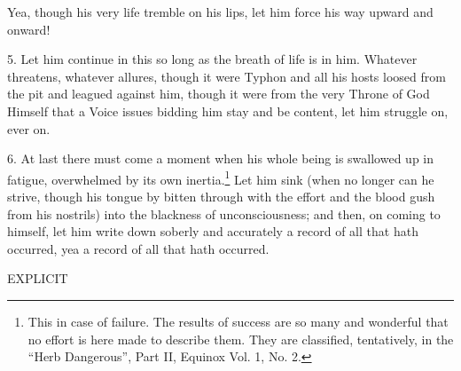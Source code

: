 Yea, though his very life tremble on his lips, let him force his way upward and onward!

5. Let him continue in this so long as the breath of life is in him. Whatever threatens, whatever allures, though it were Typhon and all his hosts loosed from the pit and leagued against him, though it were from the very Throne of God Himself that a Voice issues bidding him stay and be content, let him struggle on, ever on.

6. At last there must come a moment when his whole being is swallowed up in fatigue, overwhelmed by its own inertia.\footnote{This in case of failure. The results of success are so many and wonderful that no effort is here made to describe them. They are classified, tentatively, in the \enquote{Herb Dangerous}, Part II, Equinox Vol. 1, No. 2.} Let him sink (when no longer can he strive, though his tongue by bitten through with the effort and the blood gush from his nostrils) into the blackness of unconsciousness; and then, on coming to himself, let him write down soberly and accurately a record of all that hath occurred, yea a record of all that hath occurred.

{
\centering

\textsc{EXPLICIT}
\par
}
